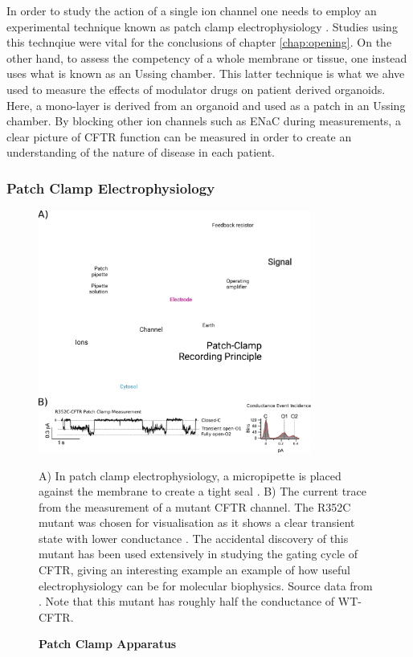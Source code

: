 In order to study the action of a single ion channel one needs to employ an experimental technique known as patch clamp electrophysiology \cite{}. Studies using this technqiue were vital for the conclusions of chapter \ref{chap:opening}. On the other hand, to assess the competency of a whole membrane or tissue, one instead uses what is known as an Ussing chamber. This latter technique is what we ahve used to measure the effects of modulator drugs on patient derived organoids. Here, a mono-layer is derived from an organoid and used as a patch in an Ussing chamber. By blocking other ion channels such as ENaC during measurements, a clear picture of CFTR function can be measured in order to create an understanding of the nature of disease in each patient. 

\subsubsection{Patch Clamp Electrophysiology}
\begin{figure}
	\label{patch_clamp}
	\begin{center}
	\includegraphics[width=0.8\textwidth]{figures/R352C_ephys_measurement_figure.pdf}
	\end{center}
	\captionsetup{singlelinecheck = false, justification=raggedright}
	\caption[Patch Clamp Apparatus] {\textbf{Patch Clamp Apparatus}}{A) In patch clamp electrophysiology, a micropipette is placed against the membrane to create a tight seal \cite{patch_clamp_recording_principal_figure}. B) The current trace from the measurement of a mutant CFTR channel. The R352C mutant was chosen for visualisation as it shows a clear transient state with lower conductance \cite{jih2012}. The accidental discovery of this mutant has been used extensively in studying the gating cycle of CFTR, giving an interesting example an example of how useful electrophysiology can be for molecular biophysics. Source data from \cite{jih2012}. Note that this mutant has roughly half the conductance of WT-CFTR.} 
\end{figure}

